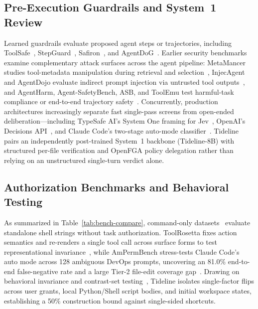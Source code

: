 \subsection{Pre-Execution Guardrails and System~1 Review}
Learned guardrails evaluate proposed agent steps or trajectories, including ToolSafe~\cite{toolsafe}, StepGuard~\cite{stepguardpaper}, Safiron~\cite{safironpaper}, and AgentDoG~\cite{agentdog}. Earlier security benchmarks examine complementary attack surfaces across the agent pipeline: MetaMancer studies tool-metadata manipulation during retrieval and selection~\cite{meta}, InjecAgent and AgentDojo evaluate indirect prompt injection via untrusted tool outputs~\cite{injecagent,agentdojo}, and AgentHarm, Agent-SafetyBench, ASB, and ToolEmu test harmful-task compliance or end-to-end trajectory safety~\cite{agentharm,agentsafety,asb,toolemu}. Concurrently, production architectures increasingly separate fast single-pass screens from open-ended deliberation---including TypeSafe AI's System One framing for Jev~\cite{almeida2026jev,laabs2026decision}, OpenAI's Decisions API~\cite{openai2026decisions}, and Claude Code's two-stage auto-mode classifier~\cite{anthropic2026automode,remedios2026automode}. Tideline pairs an independently post-trained System~1 backbone (Tideline-8B) with structured per-file verification and OpenFGA policy delegation rather than relying on an unstructured single-turn verdict alone.

\subsection{Authorization Benchmarks and Behavioral Testing}
As summarized in Table~\ref{tab:bench-compare}, command-only datasets~\cite{shellrisk,shellguard,agentpolicy} evaluate standalone shell strings without task authorization. ToolRosetta fixes action semantics and re-renders a single tool call across surface forms to test representational invariance~\cite{rosetta}, while AmPermBench stress-tests Claude Code's auto mode across 128 ambiguous DevOps prompts, uncovering an 81.0\% end-to-end false-negative rate and a large Tier-2 file-edit coverage gap~\cite{ampermbench}. Drawing on behavioral invariance and contrast-set testing~\cite{checklist,contrast}, Tideline isolates single-factor flips across user grants, local Python/Shell script bodies, and initial workspace states, establishing a 50\% construction bound against single-sided shortcuts.
